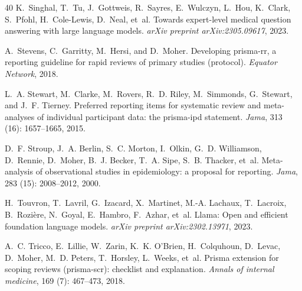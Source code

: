 \documentclass{article}
\begin{document}
\begin{thebibliography}{40}
K.~Singhal, T.~Tu, J.~Gottweis, R.~Sayres, E.~Wulczyn, L.~Hou, K.~Clark,
  S.~Pfohl, H.~Cole-Lewis, D.~Neal, et~al.
\newblock Towards expert-level medical question answering with large language
  models.
\newblock \emph{arXiv preprint arXiv:2305.09617}, 2023.

A.~Stevens, C.~Garritty, M.~Hersi, and D.~Moher.
\newblock Developing prisma-rr, a reporting guideline for rapid reviews of
  primary studies (protocol).
\newblock \emph{Equator Network}, 2018.

L.~A. Stewart, M.~Clarke, M.~Rovers, R.~D. Riley, M.~Simmonds, G.~Stewart, and
  J.~F. Tierney.
\newblock Preferred reporting items for systematic review and meta-analyses of
  individual participant data: the prisma-ipd statement.
\newblock \emph{Jama}, 313 (16): 1657--1665, 2015.

D.~F. Stroup, J.~A. Berlin, S.~C. Morton, I.~Olkin, G.~D. Williamson,
  D.~Rennie, D.~Moher, B.~J. Becker, T.~A. Sipe, S.~B. Thacker, et~al.
\newblock Meta-analysis of observational studies in epidemiology: a proposal
  for reporting.
\newblock \emph{Jama}, 283 (15): 2008--2012, 2000.

H.~Touvron, T.~Lavril, G.~Izacard, X.~Martinet, M.-A. Lachaux, T.~Lacroix,
  B.~Rozi{\`e}re, N.~Goyal, E.~Hambro, F.~Azhar, et~al.
\newblock Llama: Open and efficient foundation language models.
\newblock \emph{arXiv preprint arXiv:2302.13971}, 2023.

A.~C. Tricco, E.~Lillie, W.~Zarin, K.~K. O'Brien, H.~Colquhoun, D.~Levac,
  D.~Moher, M.~D. Peters, T.~Horsley, L.~Weeks, et~al.
\newblock Prisma extension for scoping reviews (prisma-scr): checklist and
  explanation.
\newblock \emph{Annals of internal medicine}, 169 (7):
  467--473, 2018.


\end{thebibliography}
\end{document}
